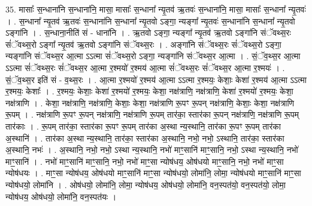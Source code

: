 \documentclass[17pt]{extarticle}
\begin{document}
35. मासाः᳚ स॒न्धाना॑नि स॒न्धाना॑नि॒ मासा॒ मासाः᳚ स॒न्धाना᳚ न्यृ॒तव॑ ऋ॒तवः॑ स॒न्धाना॑नि॒ मासा॒ मासाः᳚ स॒न्धाना᳚ न्यृ॒तवः॑ । . स॒न्धाना᳚ न्यृ॒तव॑ ऋ॒तवः॑ स॒न्धाना॑नि स॒न्धाना᳚ न्यृ॒तवो ऽङ्गा॒ न्यङ्गा᳚ न्यृ॒तवः॑ स॒न्धाना॑नि स॒न्धाना᳚ न्यृ॒तवो ऽङ्गा॑नि । . स॒न्धाना॒नीति॑ सं - धाना॑नि । . ऋ॒तवो ऽङ्गा॒ न्यङ्गा᳚ न्यृ॒तव॑ ऋ॒तवो ऽङ्गा॑नि संॅवथ्स॒रः सं॑ॅवथ्स॒रो ऽङ्गा᳚ न्यृ॒तव॑ ऋ॒तवो ऽङ्गा॑नि संॅवथ्स॒रः । . अङ्गा॑नि संॅवथ्स॒रः सं॑ॅवथ्स॒रो ऽङ्गा॒ न्यङ्गा॑नि संॅवथ्स॒र आ॒त्मा ऽऽत्मा सं॑ॅवथ्स॒रो ऽङ्गा॒ न्यङ्गा॑नि संॅवथ्स॒र आ॒त्मा । . सं॒ॅव॒थ्स॒र आ॒त्मा ऽऽत्मा सं॑ॅवथ्स॒रः सं॑ॅवथ्स॒र आ॒त्मा र॒श्मयो॑ र॒श्मय॑ आ॒त्मा सं॑ॅवथ्स॒रः सं॑ॅवथ्स॒र आ॒त्मा र॒श्मयः॑ । . सं॒ॅव॒थ्स॒र इति॑ सं - व॒थ्स॒रः । . आ॒त्मा र॒श्मयो॑ र॒श्मय॑ आ॒त्मा ऽऽत्मा र॒श्मयः॒ केशाः॒ केशा॑ र॒श्मय॑ आ॒त्मा ऽऽत्मा र॒श्मयः॒ केशाः᳚ । . र॒श्मयः॒ केशाः॒ केशा॑ र॒श्मयो॑ र॒श्मयः॒ केशा॒ नक्ष॑त्राणि॒ नक्ष॑त्राणि॒ केशा॑ र॒श्मयो॑ र॒श्मयः॒ केशा॒ नक्ष॑त्राणि । . केशा॒ नक्ष॑त्राणि॒ नक्ष॑त्राणि॒ केशाः॒ केशा॒ नक्ष॑त्राणि रू॒पꣳ रू॒पन् नक्ष॑त्राणि॒ केशाः॒ केशा॒ नक्ष॑त्राणि रू॒पम् । . नक्ष॑त्राणि रू॒पꣳ रू॒पन् नक्ष॑त्राणि॒ नक्ष॑त्राणि रू॒पम् तार॑का॒ स्तार॑का रू॒पन् नक्ष॑त्राणि॒ नक्ष॑त्राणि रू॒पम् तार॑काः । . रू॒पम् तार॑का॒ स्तार॑का रू॒पꣳ रू॒पम् तार॑का अ॒स्था न्य॒स्थानि॒ तार॑का रू॒पꣳ रू॒पम् तार॑का अ॒स्थानि॑ । . तार॑का अ॒स्था न्य॒स्थानि॒ तार॑का॒ स्तार॑का अ॒स्थानि॒ नभो॒ नभो॒ ऽस्थानि॒ तार॑का॒ स्तार॑का अ॒स्थानि॒ नभः॑ । . अ॒स्थानि॒ नभो॒ नभो॒ ऽस्था न्य॒स्थानि॒ नभो॑ माꣳ॒॒सानि॑ माꣳ॒॒सानि॒ नभो॒ ऽस्था न्य॒स्थानि॒ नभो॑ माꣳ॒॒सानि॑ । . नभो॑ माꣳ॒॒सानि॑ माꣳ॒॒सानि॒ नभो॒ नभो॑ माꣳ॒॒सा न्योष॑धय॒ ओष॑धयो माꣳ॒॒सानि॒ नभो॒ नभो॑ माꣳ॒॒सा न्योष॑धयः । . माꣳ॒॒सा न्योष॑धय॒ ओष॑धयो माꣳ॒॒सानि॑ माꣳ॒॒सा न्योष॑धयो॒ लोमा॑नि॒ लोमा॒ न्योष॑धयो माꣳ॒॒सानि॑ माꣳ॒॒सा न्योष॑धयो॒ लोमा॑नि । . ओष॑धयो॒ लोमा॑नि॒ लोमा॒ न्योष॑धय॒ ओष॑धयो॒ लोमा॑नि॒ वन॒स्पत॑यो॒ वन॒स्पत॑यो॒ लोमा॒
न्योष॑धय॒ ओष॑धयो॒ लोमा॑नि॒ वन॒स्पत॑यः । \newline
\end{document}
